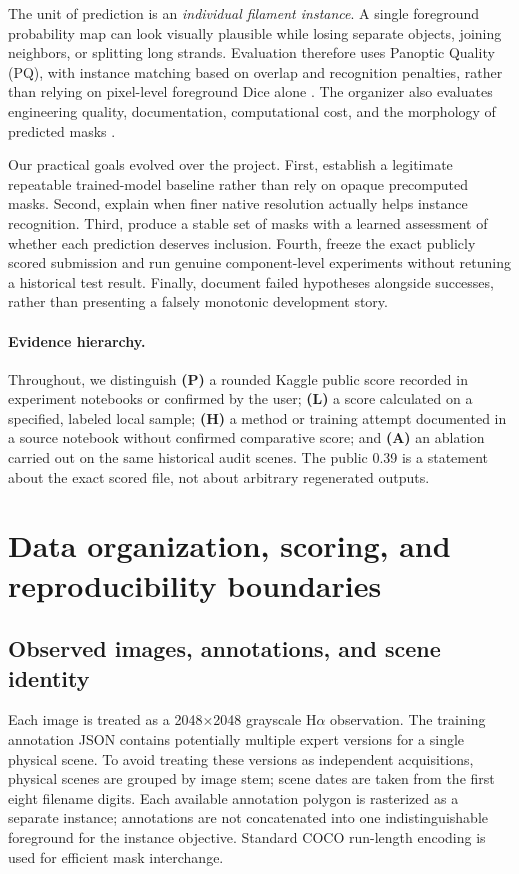 \documentclass[11pt,a4paper]{article}
\begin{document}
The unit of prediction is an \emph{individual filament instance}. A single foreground probability map can look visually plausible while losing separate objects, joining neighbors, or splitting long strands. Evaluation therefore uses Panoptic Quality (PQ), with instance matching based on overlap and recognition penalties, rather than relying on pixel-level foreground Dice alone \cite{kirillov}. The organizer also evaluates engineering quality, documentation, computational cost, and the morphology of predicted masks \cite{challenge}.

Our practical goals evolved over the project. First, establish a legitimate repeatable trained-model baseline rather than rely on opaque precomputed masks. Second, explain when finer native resolution actually helps instance recognition. Third, produce a stable set of masks with a learned assessment of whether each prediction deserves inclusion. Fourth, freeze the exact publicly scored submission and run genuine component-level experiments without retuning a historical test result. Finally, document failed hypotheses alongside successes, rather than presenting a falsely monotonic development story.

\paragraph{Evidence hierarchy.} Throughout, we distinguish \textbf{(P)} a rounded Kaggle public score recorded in experiment notebooks or confirmed by the user; \textbf{(L)} a score calculated on a specified, labeled local sample; \textbf{(H)} a method or training attempt documented in a source notebook without confirmed comparative score; and \textbf{(A)} an ablation carried out on the same historical audit scenes. The public 0.39 is a statement about the exact scored file, not about arbitrary regenerated outputs.

\section{Data organization, scoring, and reproducibility boundaries}
\subsection{Observed images, annotations, and scene identity}
Each image is treated as a 2048$\times$2048 grayscale H$\alpha$ observation. The training annotation JSON contains potentially multiple expert versions for a single physical scene. To avoid treating these versions as independent acquisitions, physical scenes are grouped by image stem; scene dates are taken from the first eight filename digits. Each available annotation polygon is rasterized as a separate instance; annotations are not concatenated into one indistinguishable foreground for the instance objective. Standard COCO run-length encoding is used for efficient mask interchange.
\end{document}

